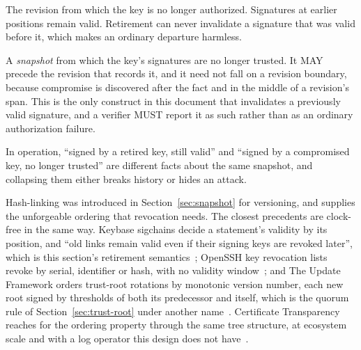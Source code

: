 \documentclass[11pt,a4paper]{article}
\begin{document}
\begin{description}[leftmargin=2.2em, style=sameline, font=\normalfont\bfseries]
  \item[\texttt{retired\_from}] The revision from which the key is no longer
  authorized. Signatures at earlier positions remain valid. Retirement can never invalidate a signature that was valid before it, which
makes an ordinary departure harmless.
  \item[\texttt{compromised\_from}] A \emph{snapshot} from which the key's
  signatures are no longer trusted. It MAY precede the revision that records it,
  and it need not fall on a revision boundary, because compromise is discovered
  after the fact and in the middle of a revision's span. This is the only
  construct in this document that invalidates a previously valid signature, and a
  verifier MUST report it as such rather than as an ordinary authorization
  failure.
\end{description}

In operation, ``signed by a retired key, still valid'' and ``signed by a
compromised key, no longer trusted'' are different facts about the same
snapshot, and collapsing them either breaks history or hides an attack.

Hash-linking was introduced in Section~\ref{sec:snapshot} for versioning, and
supplies the unforgeable ordering that revocation needs. The closest
precedents are clock-free in the same way. Keybase sigchains decide a
statement's validity by its position, and ``old links remain valid even if
their signing keys are revoked later'', which is this section's retirement
semantics~\cite{keybase_sigchain}; OpenSSH key revocation lists revoke by
serial, identifier or hash, with no validity window~\cite{openssh_krl}; and
The Update Framework orders trust-root rotations by monotonic version number,
each new root signed by thresholds of both its predecessor and itself, which
is the quorum rule of Section~\ref{sec:trust-root} under another
name~\cite{tuf_spec}. Certificate Transparency reaches for the ordering
property through the same tree structure, at ecosystem scale and with a log
operator this design does not have~\cite{rfc9162}.
\end{document}
